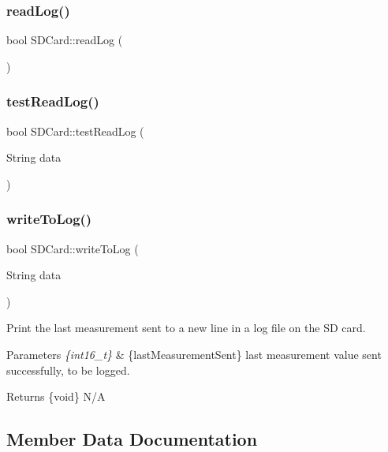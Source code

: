 \subsubsection{\texorpdfstring{read\+Log()}{readLog()}}
{\footnotesize\ttfamily bool S\+D\+Card\+::read\+Log (\begin{DoxyParamCaption}{ }\end{DoxyParamCaption})}

\mbox{\label{class_s_d_card_ad5832b1d4274a99ca975f4c570584f53}} 
\subsubsection{\texorpdfstring{test\+Read\+Log()}{testReadLog()}}
{\footnotesize\ttfamily bool S\+D\+Card\+::test\+Read\+Log (\begin{DoxyParamCaption}\item[{String}]{data }\end{DoxyParamCaption})}

\mbox{\label{class_s_d_card_aa65251052d32bcaff9f087080118525f}} 
\subsubsection{\texorpdfstring{write\+To\+Log()}{writeToLog()}}
{\footnotesize\ttfamily bool S\+D\+Card\+::write\+To\+Log (\begin{DoxyParamCaption}\item[{String}]{data }\end{DoxyParamCaption})}

Print the last measurement sent to a new line in a log file on the SD card. 
\begin{DoxyParams}{Parameters}
{\em \{int16\+\_\+t\}} & \{last\+Measurement\+Sent\} last measurement value sent successfully, to be logged. \\
\hline
\end{DoxyParams}
\begin{DoxyReturn}{Returns}
\{void\} N/A 
\end{DoxyReturn}


\subsection{Member Data Documentation}
\mbox{\label{class_s_d_card_a20919e15549972b09ad3c063c35fcf59}} 
